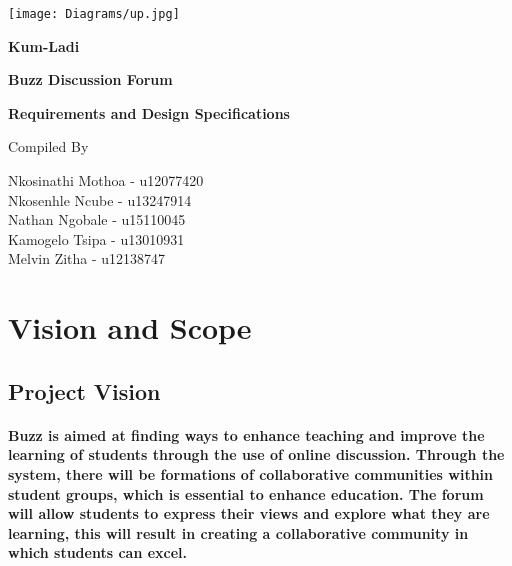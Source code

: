 \documentclass[12pt]{article}
\begin{document}
\begin{titlepage}
\begin{center}
\texttt{[image: Diagrams/up.jpg]}
\bigskip
\bigskip
\bigskip
\begin{huge}
\textbf{Kum-Ladi}
	
\bigskip
\bigskip
\bigskip
\textbf{Buzz Discussion Forum}
\bigskip
\bigskip
\bigskip
\end{huge}

 \begin{huge}
 \textbf{Requirements and Design Specifications}
\end{huge}

\bigskip
\bigskip
\bigskip

Compiled By \\[\baselineskip]
{\large

Nkosinathi Mothoa - u12077420\\
Nkosenhle Ncube - u13247914\\
Nathan Ngobale - u15110045\\
Kamogelo Tsipa - u13010931\\
Melvin Zitha - u12138747\\ 
\par}

\end{center}

\end{titlepage}

\newpage
\tableofcontents

\newpage
\section{Vision and Scope}    

\subsection{Project Vision} 

\paragraph{Buzz is aimed at finding ways to enhance teaching and improve the learning of students through the use of online discussion. Through the system, there will be formations of collaborative communities within student groups, which is essential to enhance education. The forum will allow students to express their views and explore what they are learning, this will result in creating a collaborative community in which students can excel.}
\end{document}
